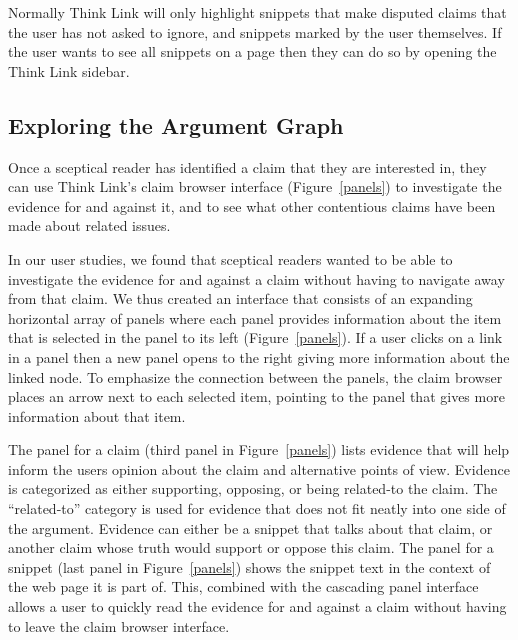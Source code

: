 \documentclass{chi2009}
\newcommand{\todo}[1]{}
\begin{document}
Normally Think Link will only highlight snippets that make disputed claims that the user has not asked to ignore, and snippets marked by the user themselves. If the user wants to see all snippets on a page then they can do so by opening the Think Link sidebar. 

\todo{ignore button}
\todo{talk about the margin?}
\todo{Talk about snippet and topic previewing}

\subsection{Exploring the Argument Graph}

Once a sceptical reader has identified a claim that they are interested in, they can use Think Link's claim browser interface (Figure~\ref{panels}) to investigate the evidence for and against it, and to see what other contentious claims have been made about related issues. 

In our user studies, we found that sceptical readers wanted to be able to investigate the evidence for and against a claim without having to navigate away from that claim. We thus created an interface that consists of an expanding horizontal array of panels where each panel provides information about the item that is selected in the panel to its left (Figure~\ref{panels}). If a user clicks on a link in a panel then a new panel opens to the right giving more information about the linked node. To emphasize the connection between the panels, the claim browser places an arrow next to each selected item, pointing to the panel that gives more information about that item.

The panel for a claim (third panel in Figure~\ref{panels}) lists evidence that will help inform the users opinion about the claim and alternative points of view. Evidence is categorized as either supporting, opposing, or being related-to the claim. The ``related-to'' category is used for evidence that does not fit neatly into one side of the argument. Evidence can either be a snippet that talks about that claim, or another claim whose truth would support or oppose this claim.  The panel for a snippet (last panel in Figure~\ref{panels}) shows the snippet text in the context of the web page it is part of. This, combined with the cascading panel interface allows a user to quickly read the evidence for and against a claim without having to leave the claim browser interface.

\todo{Remove ``related`` from the topics list - confuses with related claims}
\todo{Show the other panels?}
\end{document}
